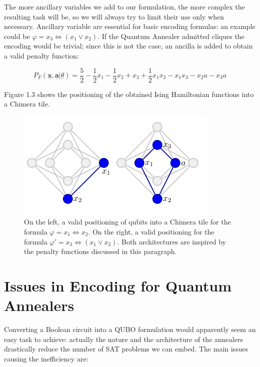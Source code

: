 The more ancillary variables we add to our formulation, the more complex the resulting task will be, so we will always try to limit their use only when necessary. Ancillary variable are essential for basic encoding formulas: an example could be $\varphi = x_3 \iff (x_1 \vee x_2)$. If the Quantum Annealer admitted cliques the encoding would be trivial; since this is not the case, an ancilla is added to obtain a valid penalty function:

\begin{equation}
    P_F(\underline{\textbf{x}},\underline{\textbf{a}} | \underline{\theta}) = \frac{5}{2} - \frac{1}{2} x_1 - \frac{1}{2} x_2 + x_3 + \frac{1}{2} x_1x_2 - x_1x_3 - x_2a -x_3a
\end{equation}

Figure 1.3 shows the positioning of the obtained Ising Hamiltonian functions into a Chimera tile.
\begin{figure}[t]
	\begin{center}
	\includegraphics{Ising1+2.png}
	\caption{On the left, a valid positioning of qubits into a Chimera tile for the formula $\varphi = x_1 \iff x_2$. On the right, a valid positioning for the formula $\varphi ' = x_3 \iff (x_1 \vee x_2)$. Both architectures are inspired by the penalty functions discussed in this paragraph.}
	\end{center}
\end{figure}

\section{Issues in Encoding for Quantum Annealers}

Converting a Boolean circuit into a QUBO formulation would apparently seem an easy task to achieve: actually the nature and the architecture of the annealers drastically reduce the number of SAT problems we can embed. The main issues causing the inefficiency are:

